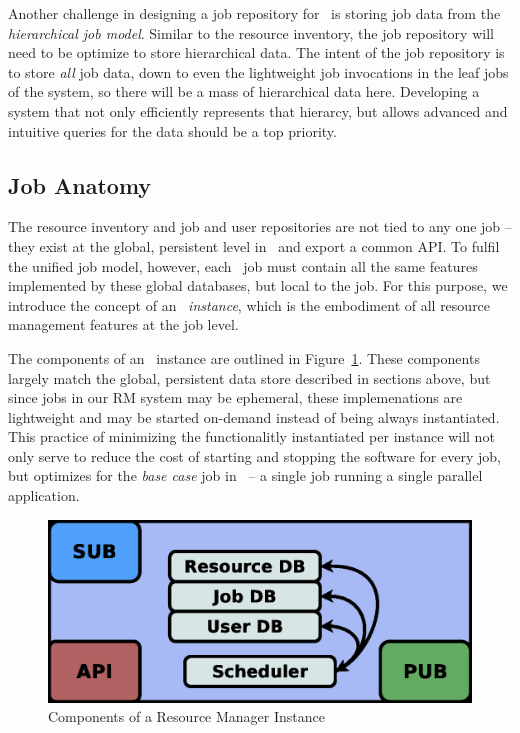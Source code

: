 Another challenge in designing a job repository for \ngrm\ is
storing job data from the \emph{hierarchical job model}. Similar
to the resource inventory, the job repository will need to be
optimize to store hierarchical data. The intent of the job
repository is to store \emph{all} job data, down to even the
lightweight job invocations in the leaf jobs of the system,
so there will be a mass of hierarchical data here. Developing
a system that not only efficiently represents that hierarcy,
but allows advanced and intuitive queries for the data should
be a top priority.

\subsection{Job Anatomy}
\label{sect:jobanatomy}

The resource inventory and job and user repositories are
not tied to any one job -- they exist at the global, persistent
level in \ngrm\ and export a common API.  To fulfil the unified
job model, however, each \ngrm\ job must contain all the
same features implemented by these global databases, but local
to the job. For this purpose, we introduce the concept of
an \ngrm\ \emph{instance}, which is the embodiment of all
resource management features at the job level.

The components of an \ngrm\ instance are outlined in
Figure~\ref{fig:rminstance}.  These components largely match the
global, persistent data store described in sections above, but since
jobs in our RM system may be ephemeral, these implemenations are
lightweight and may be started on-demand instead of being always
instantiated. This practice of minimizing the functionalitly
instantiated per instance will not only serve to reduce the cost
of starting and stopping the software for every job, but optimizes
for the \emph{base case} job in \ngrm\ -- a single job running a
single parallel application.

\begin{figure}
\centering
\includegraphics[scale=0.30]{../fig/RM-instance.eps}
\caption{Components of a Resource Manager Instance}
\label{fig:rminstance}
\end{figure}


